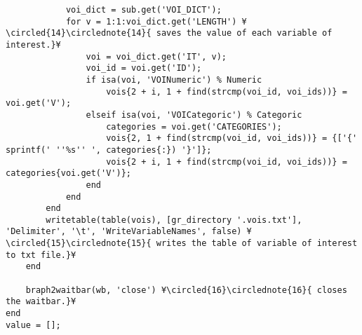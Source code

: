 \documentclass{tufte-handout}
\begin{document}
\begin{lstlisting}
            voi_dict = sub.get('VOI_DICT');
            for v = 1:1:voi_dict.get('LENGTH') ¥\circled{14}\circlednote{14}{ saves the value of each variable of interest.}¥
                voi = voi_dict.get('IT', v);
                voi_id = voi.get('ID');
                if isa(voi, 'VOINumeric') % Numeric
                    vois{2 + i, 1 + find(strcmp(voi_id, voi_ids))} = voi.get('V');
                elseif isa(voi, 'VOICategoric') % Categoric
                    categories = voi.get('CATEGORIES');
                    vois{2, 1 + find(strcmp(voi_id, voi_ids))} = {['{' sprintf(' ''%s'' ', categories{:}) '}']}; 
                    vois{2 + i, 1 + find(strcmp(voi_id, voi_ids))} = categories{voi.get('V')};
                end
            end
        end
        writetable(table(vois), [gr_directory '.vois.txt'], 'Delimiter', '\t', 'WriteVariableNames', false) ¥\circled{15}\circlednote{15}{ writes the table of variable of interest to txt file.}¥
    end
    
    braph2waitbar(wb, 'close') ¥\circled{16}\circlednote{16}{ closes the waitbar.}¥
end
value = [];

\end{lstlisting}
\end{document}
